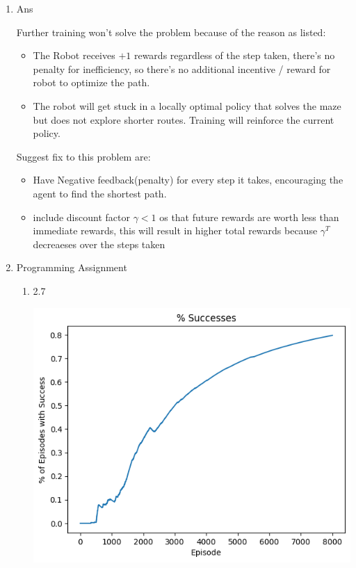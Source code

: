 \documentclass[12pt]{article}
\begin{document}
\begin{enumerate}
\begin{enumerate}
\end{enumerate}
\item Ans
\begin{tcolorbox}
    Further training won't solve the problem because of the reason as listed:
    \begin{itemize}
        \item The Robot receives \(+1\) rewards regardless of the step taken, there's no penalty for inefficiency, so there's no additional incentive / reward for robot to optimize the path.
        \item The robot will get stuck in a locally optimal policy that solves the maze but does not explore shorter routes. Training will reinforce the current policy.
    \end{itemize}
    Suggest fix to this problem are:
    \begin{itemize}
        \item Have Negative feedback(penalty) for every step it takes, encouraging the agent to find the shortest path.
        \item include discount factor \(\gamma < 1\) os that future rewards are worth less than immediate rewards, this will result in higher total rewards because \(\gamma^T\) decreaeses over the steps taken
    \end{itemize}
\end{tcolorbox}
\item Programming Assignment
\begin{enumerate}
    \item 2.7
    \begin{center}
    \includegraphics[scale = 0.5]{images/2.7.1.png}

\end{center}
\end{enumerate}
\end{enumerate}
\end{document}
